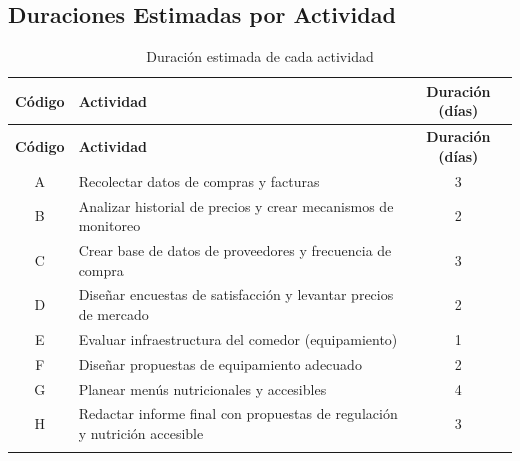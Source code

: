 \documentclass[letterpaper, 11pt]{report}
\begin{document}
\newpage
\subsection{Duraciones Estimadas por Actividad}

\begin{longtable}{|c|p{.6\linewidth}|c|}
      \hline

      \textbf{Código}                               & \textbf{Actividad}                     & \textbf{Duración (días)} \\
      \hline
      \endfirsthead

      \hline

      \textbf{Código}                               & \textbf{Actividad}                     & \textbf{Duración (días)} \\
      \hline
      \endhead

      A                                             & Recolectar datos de compras y facturas & 3                        \\ \hline B                                   & Analizar historial
      de precios y crear mecanismos de monitoreo    & 2                                                                 \\ \hline C                                    & Crear base de
      datos de proveedores y frecuencia de compra   & 3                                                                 \\ \hline D                                      & Diseñar encuestas
      de satisfacción y levantar precios de mercado & 2                                                                 \\ \hline E                                   & Evaluar
      infraestructura del comedor (equipamiento)    & 1                                                                 \\ \hline F                 & Diseñar propuestas
      de equipamiento adecuado                      & 2                                                                 \\ \hline G   & Planear menús nutricionales y
      accesibles                                    & 4                                                                 \\ \hline H                         & Redactar informe final con propuestas de
      regulación y nutrición accesible              & 3                                                                 \\ \hline

      \caption{Duración estimada de cada actividad}
\end{longtable}
\end{document}
